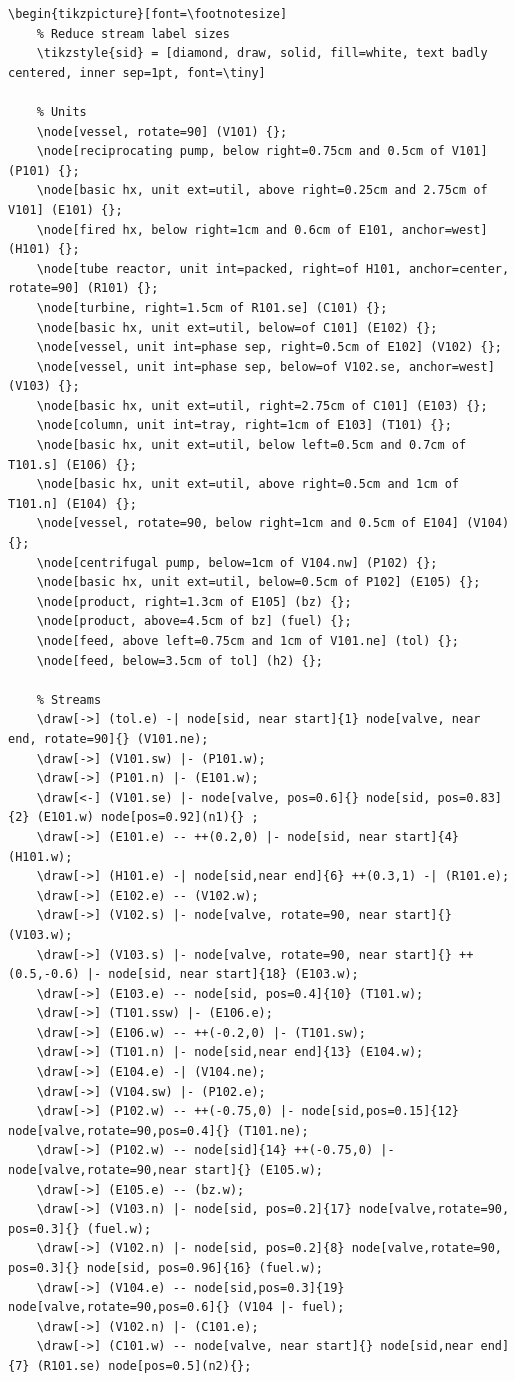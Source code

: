 \documentclass[11pt]{article}
\begin{document}
\begin{lstlisting}
\begin{tikzpicture}[font=\footnotesize]
	% Reduce stream label sizes
	\tikzstyle{sid} = [diamond, draw, solid, fill=white, text badly centered, inner sep=1pt, font=\tiny]
	
	% Units	
	\node[vessel, rotate=90] (V101) {};
	\node[reciprocating pump, below right=0.75cm and 0.5cm of V101] (P101) {};
	\node[basic hx, unit ext=util, above right=0.25cm and 2.75cm of V101] (E101) {};
	\node[fired hx, below right=1cm and 0.6cm of E101, anchor=west] (H101) {};
	\node[tube reactor, unit int=packed, right=of H101, anchor=center, rotate=90] (R101) {};
	\node[turbine, right=1.5cm of R101.se] (C101) {};
	\node[basic hx, unit ext=util, below=of C101] (E102) {};
	\node[vessel, unit int=phase sep, right=0.5cm of E102] (V102) {};
	\node[vessel, unit int=phase sep, below=of V102.se, anchor=west] (V103) {};
	\node[basic hx, unit ext=util, right=2.75cm of C101] (E103) {};
	\node[column, unit int=tray, right=1cm of E103] (T101) {};
	\node[basic hx, unit ext=util, below left=0.5cm and 0.7cm of T101.s] (E106) {};
	\node[basic hx, unit ext=util, above right=0.5cm and 1cm of T101.n] (E104) {};
	\node[vessel, rotate=90, below right=1cm and 0.5cm of E104] (V104) {};
	\node[centrifugal pump, below=1cm of V104.nw] (P102) {};
	\node[basic hx, unit ext=util, below=0.5cm of P102] (E105) {};
	\node[product, right=1.3cm of E105] (bz) {};
	\node[product, above=4.5cm of bz] (fuel) {};
	\node[feed, above left=0.75cm and 1cm of V101.ne] (tol) {};
	\node[feed, below=3.5cm of tol] (h2) {};
	
	% Streams
	\draw[->] (tol.e) -| node[sid, near start]{1} node[valve, near end, rotate=90]{} (V101.ne);
	\draw[->] (V101.sw) |- (P101.w);
	\draw[->] (P101.n) |- (E101.w);
	\draw[<-] (V101.se) |- node[valve, pos=0.6]{} node[sid, pos=0.83]{2} (E101.w) node[pos=0.92](n1){} ;
	\draw[->] (E101.e) -- ++(0.2,0) |- node[sid, near start]{4} (H101.w);
	\draw[->] (H101.e) -| node[sid,near end]{6} ++(0.3,1) -| (R101.e);	
	\draw[->] (E102.e) -- (V102.w);
	\draw[->] (V102.s) |- node[valve, rotate=90, near start]{} (V103.w);
	\draw[->] (V103.s) |- node[valve, rotate=90, near start]{} ++(0.5,-0.6) |- node[sid, near start]{18} (E103.w);
	\draw[->] (E103.e) -- node[sid, pos=0.4]{10} (T101.w);			
	\draw[->] (T101.ssw) |- (E106.e);
	\draw[->] (E106.w) -- ++(-0.2,0) |- (T101.sw);		
	\draw[->] (T101.n) |- node[sid,near end]{13} (E104.w);
	\draw[->] (E104.e) -| (V104.ne);
	\draw[->] (V104.sw) |- (P102.e);
	\draw[->] (P102.w) -- ++(-0.75,0) |- node[sid,pos=0.15]{12} node[valve,rotate=90,pos=0.4]{} (T101.ne);
	\draw[->] (P102.w) -- node[sid]{14} ++(-0.75,0) |- node[valve,rotate=90,near start]{} (E105.w);
	\draw[->] (E105.e) -- (bz.w);
	\draw[->] (V103.n) |- node[sid, pos=0.2]{17} node[valve,rotate=90, pos=0.3]{} (fuel.w);
	\draw[->] (V102.n) |- node[sid, pos=0.2]{8} node[valve,rotate=90, pos=0.3]{} node[sid, pos=0.96]{16} (fuel.w);
	\draw[->] (V104.e) -- node[sid,pos=0.3]{19} node[valve,rotate=90,pos=0.6]{} (V104 |- fuel);
	\draw[->] (V102.n) |- (C101.e);
	\draw[->] (C101.w) -- node[valve, near start]{} node[sid,near end]{7} (R101.se) node[pos=0.5](n2){};	
	

\end{lstlisting}
\end{document}
